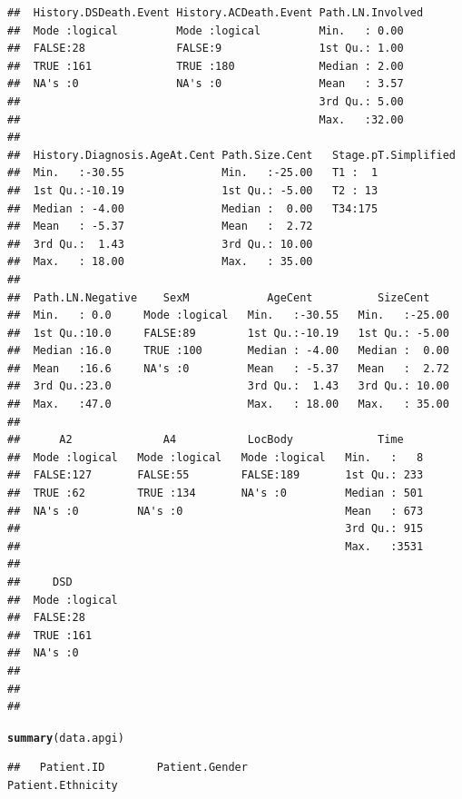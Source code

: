 \documentclass{article}\usepackage[]{graphicx}\usepackage[]{color}
\makeatletter
\newcommand{\hlstd}[1]{\textcolor[rgb]{0.345,0.345,0.345}{#1}}%
\newcommand{\hlkwd}[1]{\textcolor[rgb]{0.737,0.353,0.396}{\textbf{#1}}}%
\newenvironment{kframe}{%
 \def\at@end@of@kframe{}%
 \ifinner\ifhmode%
  \def\at@end@of@kframe{\end{minipage}}%
  \begin{minipage}{\columnwidth}%
 \fi\fi%
 \def\FrameCommand##1{\hskip\@totalleftmargin \hskip-\fboxsep
 \colorbox{shadecolor}{##1}\hskip-\fboxsep
     \hskip-\linewidth \hskip-\@totalleftmargin \hskip\columnwidth}%
 \MakeFramed {\advance\hsize-\width
   \@totalleftmargin\z@ \linewidth\hsize
   \@setminipage}}%
 {\par\unskip\endMakeFramed%
 \at@end@of@kframe}
\newenvironment{knitrout}{}{} %
\makeatother
\begin{document}
\begin{knitrout}
\begin{kframe}
\begin{verbatim}
##  History.DSDeath.Event History.ACDeath.Event Path.LN.Involved
##  Mode :logical         Mode :logical         Min.   : 0.00   
##  FALSE:28              FALSE:9               1st Qu.: 1.00   
##  TRUE :161             TRUE :180             Median : 2.00   
##  NA's :0               NA's :0               Mean   : 3.57   
##                                              3rd Qu.: 5.00   
##                                              Max.   :32.00   
##                                                              
##  History.Diagnosis.AgeAt.Cent Path.Size.Cent   Stage.pT.Simplified
##  Min.   :-30.55               Min.   :-25.00   T1 :  1            
##  1st Qu.:-10.19               1st Qu.: -5.00   T2 : 13            
##  Median : -4.00               Median :  0.00   T34:175            
##  Mean   : -5.37               Mean   :  2.72                      
##  3rd Qu.:  1.43               3rd Qu.: 10.00                      
##  Max.   : 18.00               Max.   : 35.00                      
##                                                                   
##  Path.LN.Negative    SexM            AgeCent          SizeCent     
##  Min.   : 0.0     Mode :logical   Min.   :-30.55   Min.   :-25.00  
##  1st Qu.:10.0     FALSE:89        1st Qu.:-10.19   1st Qu.: -5.00  
##  Median :16.0     TRUE :100       Median : -4.00   Median :  0.00  
##  Mean   :16.6     NA's :0         Mean   : -5.37   Mean   :  2.72  
##  3rd Qu.:23.0                     3rd Qu.:  1.43   3rd Qu.: 10.00  
##  Max.   :47.0                     Max.   : 18.00   Max.   : 35.00  
##                                                                    
##      A2              A4           LocBody             Time     
##  Mode :logical   Mode :logical   Mode :logical   Min.   :   8  
##  FALSE:127       FALSE:55        FALSE:189       1st Qu.: 233  
##  TRUE :62        TRUE :134       NA's :0         Median : 501  
##  NA's :0         NA's :0                         Mean   : 673  
##                                                  3rd Qu.: 915  
##                                                  Max.   :3531  
##                                                                
##     DSD         
##  Mode :logical  
##  FALSE:28       
##  TRUE :161      
##  NA's :0        
##                 
##                 
## 
\end{verbatim}
\begin{alltt}
\hlkwd{summary}\hlstd{(data.apgi)}
\end{alltt}
\begin{verbatim}
##   Patient.ID        Patient.Gender                      Patient.Ethnicity

\end{verbatim}
\end{kframe}
\end{knitrout}
\end{document}

